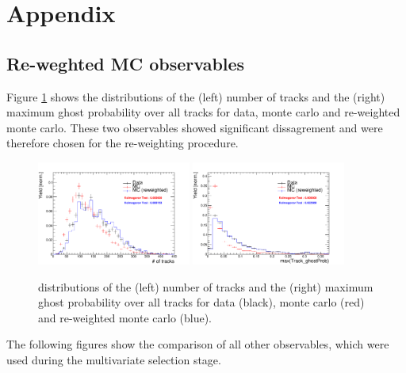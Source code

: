 \section{Appendix}
\label{sec: appendix}

\subsection{Re-weghted MC observables}
\label{sec: mcvdata}
Figure \ref{fig: reweightingVar} shows the distributions of the (left) number of tracks and the (right) maximum ghost probability over all tracks for data, monte carlo and re-weighted monte carlo.
These two observables showed significant dissagrement and were therefore chosen for the re-weighting procedure.

\begin{figure}[ht!]
\includegraphics[height=6.cm,width=0.45\textwidth]{figs/MC-v-Data/nTracks.pdf}
\includegraphics[height=6.cm,width=0.45\textwidth]{figs/MC-v-Data/max_ghostProb.pdf}
\label{fig: reweightingVar}
\caption{distributions of the (left) number of tracks and the (right) maximum ghost probability over all tracks for data (black), monte carlo (red) and re-weighted monte carlo (blue).}
\end{figure}

The following figures show the comparison of all other observables, which were used during the multivariate selection stage.


